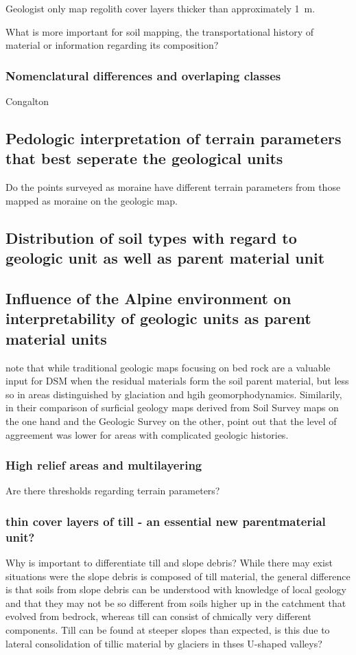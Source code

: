 \documentclass[preprint,12pt,authoryear]{elsarticle}
\begin{document}
Geologist only map regolith cover layers thicker than approximately 1~m.

What is more important for soil mapping, the transportational history of material or information regarding its composition?

\subsubsection{Nomenclatural differences and overlaping classes}
Congalton 

\subsection{Pedologic interpretation of terrain parameters that best seperate the geological units}
Do the points surveyed as moraine have different terrain parameters from those mapped as moraine on the geologic map.
\subsection{Distribution of soil types with regard to geologic unit as well as parent material unit}

\subsection{Influence of the Alpine environment on interpretability of geologic units as parent material units}
\cite{Heung2014} note that while traditional geologic maps focusing on bed rock are a valuable input for DSM when the residual materials form the soil parent material, but less so in areas distinguished by glaciation and hgih geomorphodynamics. Similarily, in their comparison of surficial geology maps derived from Soil Survey maps on the one hand and the Geologic Survey on the other, \cite{Miller2015a} point out that the level of aggreement was lower for areas with complicated geologic histories.

\subsubsection{High relief areas and multilayering}
Are there thresholds regarding terrain parameters?
\subsubsection{thin cover layers of till - an essential new parentmaterial unit?}
Why is important to differentiate till and slope debris? While there may exist situations were the slope debris is composed of till material, the general difference is that soils from slope debris can be understood with knowledge of local geology and that they may not be so different from soils higher up in the catchment that evolved from bedrock, whereas till can consist of chmically very different components.
Till can be found at steeper slopes than expected, is this due to lateral consolidation of tillic material by glaciers in thses U-shaped valleys?
\end{document}
